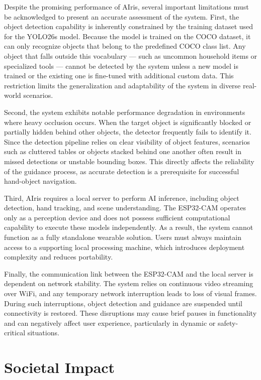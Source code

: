 \documentclass[12pt,a4paper]{report}
\begin{document}
Despite the promising performance of AIris, several important limitations must be acknowledged to present an accurate assessment of the system. First, the object detection capability is inherently constrained by the training dataset used for the YOLO26s model. Because the model is trained on the COCO dataset, it can only recognize objects that belong to the predefined COCO class list. Any object that falls outside this vocabulary — such as uncommon household items or specialized tools — cannot be detected by the system unless a new model is trained or the existing one is fine-tuned with additional custom data. This restriction limits the generalization and adaptability of the system in diverse real-world scenarios.

Second, the system exhibits notable performance degradation in environments where heavy occlusion occurs. When the target object is significantly blocked or partially hidden behind other objects, the detector frequently fails to identify it. Since the detection pipeline relies on clear visibility of object features, scenarios such as cluttered tables or objects stacked behind one another often result in missed detections or unstable bounding boxes. This directly affects the reliability of the guidance process, as accurate detection is a prerequisite for successful hand-object navigation.

Third, AIris requires a local server to perform AI inference, including object detection, hand tracking, and scene understanding. The ESP32-CAM operates only as a perception device and does not possess sufficient computational capability to execute these models independently. As a result, the system cannot function as a fully standalone wearable solution. Users must always maintain access to a supporting local processing machine, which introduces deployment complexity and reduces portability.

Finally, the communication link between the ESP32-CAM and the local server is dependent on network stability. The system relies on continuous video streaming over WiFi, and any temporary network interruption leads to loss of visual frames. During such interruptions, object detection and guidance are suspended until connectivity is restored. These disruptions may cause brief pauses in functionality and can negatively affect user experience, particularly in dynamic or safety-critical situations.

\section{Societal Impact}
\end{document}
